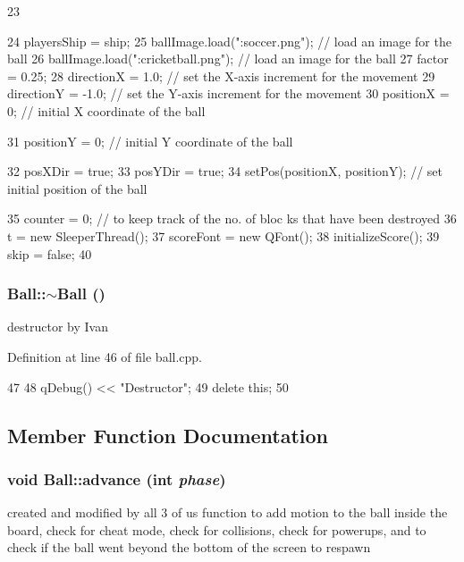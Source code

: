 \begin{DoxyCode}
23 {
24     playersShip = ship;
25     ballImage.load(":soccer.png");            // load an image for the ball
26     ballImage.load(":cricketball.png");       // load an image for the ball
27     factor = 0.25;
28     directionX = 1.0;                         // set the X-axis increment for the
       movement
29     directionY = -1.0;                        // set the Y-axis increment for the
       movement
30     positionX = 0;                            // initial X coordinate of the ball
      
31     positionY = 0;                            // initial Y coordinate of the ball
      
32     posXDir = true;
33     posYDir = true;
34     setPos(positionX, positionY);             // set initial position of the ball
      
35     counter = 0;                              // to keep track of the no. of bloc
      ks that have been destroyed
36     t = new SleeperThread();
37     scoreFont = new QFont();
38     initializeScore();
39     skip = false;
40 }
\end{DoxyCode}
\hypertarget{class_ball_a20f2f6ac0bf648f406a8e12e63429fcd}{
\subsubsection[{$\sim$Ball}]{\setlength{\rightskip}{0pt plus 5cm}Ball::$\sim$Ball ()}}
\label{class_ball_a20f2f6ac0bf648f406a8e12e63429fcd}
destructor by Ivan 

Definition at line 46 of file ball.cpp.


\begin{DoxyCode}
47 {
48     qDebug() << "Destructor";
49     delete this;
50 }
\end{DoxyCode}


\subsection{Member Function Documentation}
\hypertarget{class_ball_adc25aa6b771ad0bf296d10db4ebcd158}{
\subsubsection[{advance}]{\setlength{\rightskip}{0pt plus 5cm}void Ball::advance (int {\em phase})}}
\label{class_ball_adc25aa6b771ad0bf296d10db4ebcd158}
created and modified by all 3 of us function to add motion to the ball inside the board, check for cheat mode, check for collisions, check for powerups, and to check if the ball went beyond the bottom of the screen to respawn 

